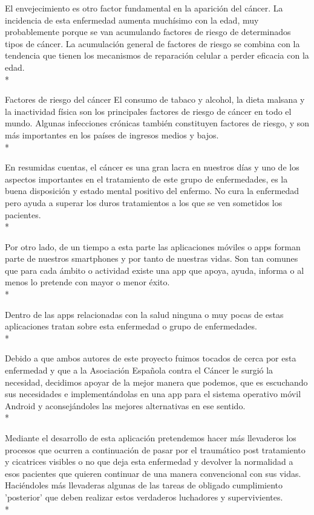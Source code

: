 \documentclass[../pfc.tex]{subfiles}
\begin{document}
El envejecimiento es otro factor fundamental en la aparición del cáncer. La incidencia de esta enfermedad aumenta muchísimo con la edad, muy probablemente porque se van acumulando factores de riesgo de determinados tipos de cáncer. La acumulación general de factores de riesgo se combina con la tendencia que tienen los mecanismos de reparación celular a perder eficacia con la edad.\\*

Factores de riesgo del cáncer
El consumo de tabaco y alcohol, la dieta malsana y la inactividad física son los principales factores de riesgo de cáncer en todo el mundo. Algunas infecciones crónicas también constituyen factores de riesgo, y son más importantes en los países de ingresos medios y bajos.\\*

En resumidas cuentas, el cáncer es una gran lacra en nuestros días \cite{OMS} y uno de los aspectos importantes en el tratamiento de este grupo de enfermedades, es la buena disposición y estado mental positivo del enfermo. No cura la enfermedad pero ayuda a superar los duros tratamientos a los que se ven sometidos los pacientes.\\*

Por otro lado, de un tiempo a esta parte las aplicaciones móviles o apps forman parte de nuestros smartphones y por tanto de nuestras vidas. Son tan comunes que para cada ámbito o actividad existe una app que apoya, ayuda, informa o al menos lo pretende con mayor o menor éxito.\\*

Dentro de las apps relacionadas con la salud ninguna o muy pocas de estas aplicaciones tratan sobre esta enfermedad o grupo de enfermedades.\\*

Debido a que ambos autores de este proyecto fuimos tocados de cerca por esta enfermedad y que a la Asociación Española contra el Cáncer le surgió la necesidad, decidimos apoyar de la mejor manera que podemos, que es escuchando sus necesidades e implementándolas en una app para el sistema operativo móvil Android y aconsejándoles las mejores alternativas en ese sentido. \\*

Mediante el desarrollo de esta aplicación pretendemos hacer más llevaderos los procesos que ocurren a continuación de pasar por el traumático post tratamiento y cicatrices visibles o no que deja esta enfermedad y devolver la normalidad a esos pacientes que quieren continuar de una manera convencional con sus vidas. Haciéndoles más llevaderas algunas de las tareas de obligado cumplimiento 'posterior' que deben realizar estos verdaderos luchadores y supervivientes.\\*
\end{document}
